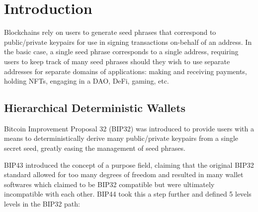 \documentclass[12pt, a4paper, twocolumn]{article}
\begin{document}




\section{Introduction}

Blockchains rely on users to generate seed phrases that correspond to public/private keypairs for use in signing transactions on-behalf of an address. In the basic case, a single seed phrase corresponds to a single address, requiring users to keep track of many seed phrases should they wish to use separate addresses for separate domains of applications: making and receiving payments, holding NFTs, engaging in a DAO, DeFi, gaming, etc.


\subsection{Hierarchical Deterministic Wallets}
\label{subsec:hd_wallets}

Bitcoin Improvement Proposal 32 (BIP32) was introduced to provide users with a means to deterministically derive many public/private keypairs from a single secret seed, greatly easing the management of seed phrases.

BIP43 introduced the concept of a purpose field, claiming that the original BIP32 standard allowed for too many degrees of freedom and resulted in many wallet softwares which claimed to be BIP32 compatible but were ultimately incompatible with each other. BIP44 took this a step further and defined 5 levels levels in the BIP32 path:
\end{document}
